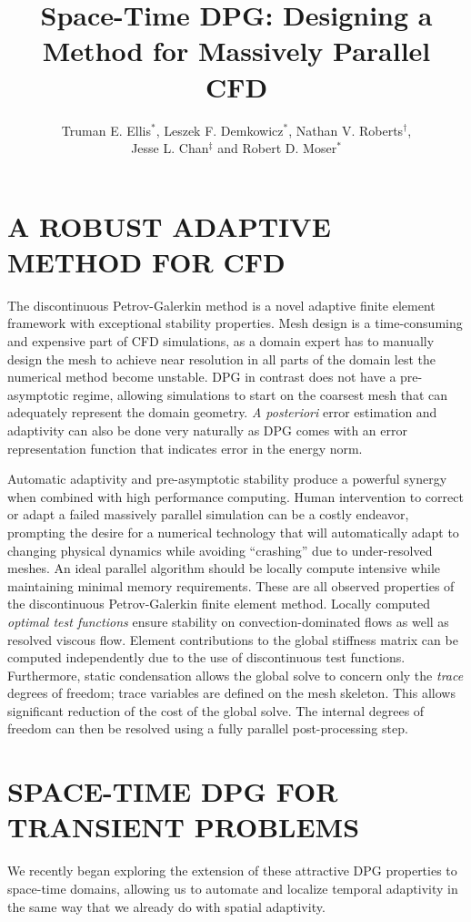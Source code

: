 \documentclass{parcfd2014}
\title{Space-Time DPG: Designing a Method for Massively Parallel CFD}
\author{Truman E. Ellis$^{*}$, Leszek F. Demkowicz$^{*}$, Nathan V. Roberts$^{\dag}$,\\ Jesse L. Chan$^{\ddag}$ and Robert D. Moser$^{*}$}
\begin{document}

\section{A ROBUST ADAPTIVE METHOD FOR CFD}
The discontinuous Petrov-Galerkin method\cite{DPGOverview} is a novel adaptive finite element framework with exceptional stability properties.
Mesh design is a time-consuming and expensive part of CFD simulations, as a domain expert has to manually design the 
mesh to achieve near resolution in all parts of the domain lest the numerical method become unstable.
DPG in contrast does not have a pre-asymptotic regime, allowing simulations to start on the coarsest mesh that can adequately represent the domain geometry.
\emph{A posteriori} error estimation and adaptivity can also be done very naturally as DPG comes with an error representation function 
that indicates error in the energy norm.

Automatic adaptivity and pre-asymptotic stability produce a powerful synergy when combined with high performance computing.
Human intervention to correct or adapt a failed massively parallel simulation can be a costly endeavor, prompting the desire for a
numerical technology that will automatically adapt to changing physical dynamics while avoiding ``crashing'' due to under-resolved meshes.
An ideal parallel algorithm should be locally compute intensive while maintaining minimal memory requirements.
These are all observed properties of the discontinuous Petrov-Galerkin finite element method.
Locally computed \emph{optimal test functions} ensure stability on convection-dominated flows as well as resolved viscous flow.
Element contributions to the global stiffness matrix can be computed independently due to the use of discontinuous test functions.
Furthermore, static condensation allows the global solve to concern only the \emph{trace} degrees of freedom; 
trace variables are defined on the mesh skeleton.  
This allows significant reduction of the cost of the global solve.  
The internal degrees of freedom can then be resolved using a fully parallel post-processing step.

\section{SPACE-TIME DPG FOR TRANSIENT PROBLEMS}
We recently began exploring the extension of these attractive DPG properties to space-time domains, allowing us to automate and localize temporal adaptivity
in the same way that we already do with spatial adaptivity. 
\end{document}
